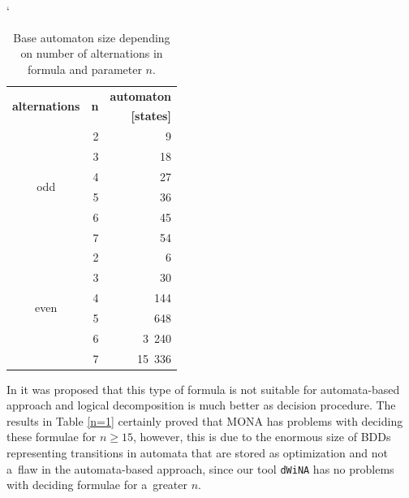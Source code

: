 \begin{table}[h!]
\catcode`
 \begin{center}
  \begin{tabular}{| c | r || r |}
  \hline
   \multirow{2}{*}{\textbf{alternations}} & \multirow{2}{*}{\textbf{n}} &
   \textbf{automaton}\\
   &								  & \textbf{[states]}\\
   \hline
   \hline
   \multirow{6}{*}{odd} & 2 & 9\\
   \cline{2-3}
   & 3 & 18\\
   \cline{2-3}
   & 4 & 27\\
   \cline{2-3}
   & 5 & 36\\
   \cline{2-3}
   & 6 & 45\\
   \cline{2-3}
   & 7 & 54\\
   \hline
   \hline
   \multirow{6}{*}{even} & 2 & 6\\
   \cline{2-3}
   & 3 & 30\\
   \cline{2-3}
   & 4 & 144\\
   \cline{2-3}
   & 5 & 648\\
   \cline{2-3}
   & 6 & 3~240\\
   \cline{2-3}
   & 7 & 15~336\\
   \hline
  \end{tabular}
 \end{center}
 \caption{Base automaton size depending on number of alternations in formula
 and parameter $n$.}\label{n-size}
\end{table}

In \cite{logic-approach} it was proposed that this type of formula is not
suitable for automata-based approach and logical decomposition is much better
as decision procedure. The results in Table \ref{n=1} certainly proved that
\textsc{MONA} has problems with deciding these formulae for $n \geq 15$,
however, this is due to the enormous size of BDDs representing transitions in
automata that are stored as optimization and not a~flaw in the automata-based
approach, since our tool \texttt{dWiNA} has no problems with deciding formulae
for a~greater $n$.


